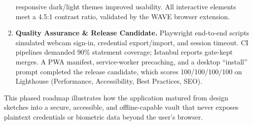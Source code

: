 \begin{enumerate}[leftmargin=*,label=\textbf{Phase \arabic*}]
      responsive dark/light themes improved usability.  All interactive
      elements meet a 4.5:1 contrast ratio, validated by the WAVE browser
      extension.
\item \textbf{Quality Assurance \& Release Candidate.}  
      Playwright end-to-end scripts simulated webcam sign-in, credential
      export/import, and session timeout.  CI pipelines demanded 90\%
      statement coverage; Istanbul reports gate-kept merges.  A PWA
      manifest, service-worker precaching, and a desktop “install” prompt
      completed the release candidate, which scores 100/100/100/100 on
      Lighthouse (Performance, Accessibility, Best Practices, SEO).
\end{enumerate}

This phased roadmap illustrates how the application matured from design
sketches into a secure, accessible, and offline-capable vault that never
exposes plaintext credentials or biometric data beyond the user's browser.


